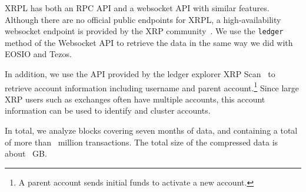 XRPL has both an RPC API and a websocket API with similar features. Although there are no official public endpoints for XRPL, a high-availability websocket endpoint is provided by the XRP community~\cite{Wind2020}. We use the \texttt{ledger} method of the Websocket API to retrieve the data in the same way we did with EOSIO and Tezos.

In addition, we use the API provided by the ledger explorer XRP Scan~\cite{xrpscan} to retrieve account information including username and parent account.\footnote{A parent account sends initial funds to activate a new account.} 
Since large XRP users such as exchanges often have multiple accounts, this account information can be used to identify and cluster accounts.

In total, we analyze \blockscount{\XRPStartBlock}{\XRPEndBlock} blocks covering seven months of data, and containing a total of more than~ million transactions. The total size of the compressed data is about~ GB.










